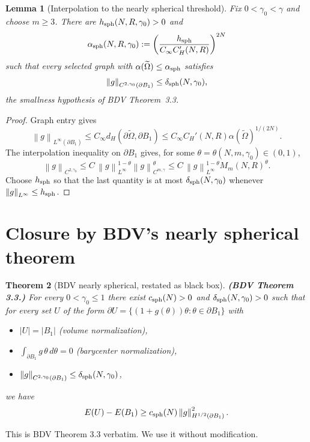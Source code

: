 \documentclass[11pt]{article}
\newtheorem{theorem}{Theorem}
\newtheorem{lemma}[theorem]{Lemma}
\theoremstyle{definition}
\newcommand{\norm}[1]{\left\|#1\right\|}
\newcommand{\abs}[1]{\left|#1\right|}
\renewcommand{\d}{\,d}
\begin{document}
\begin{lemma}[Interpolation to the nearly spherical threshold]\label{lem:interp}
Fix $0<\gamma_0<\gamma$ and choose $m\ge3$. There are
$h_{\rm sph}(N,R,\gamma_0)>0$ and
\[
\alpha_{\rm sph}(N,R,\gamma_0)
:=\left(\frac{h_{\rm sph}}{C_\infty C_H'(N,R)}\right)^{2N}
\]
such that every selected graph with
$\alpha(\widetilde\Omega)\le\alpha_{\rm sph}$ satisfies
\[
\norm{g}_{C^{2,\gamma_0}(\partial B_1)}
\le \delta_{\rm sph}(N,\gamma_0),
\]
the smallness hypothesis of BDV Theorem~3.3.
\end{lemma}

\begin{proof}
Graph entry gives
\[
\norm{g}_{L^\infty(\partial B_1)}
\le C_\infty d_H(\partial\widetilde\Omega,\partial B_1)
\le C_\infty C_H'(N,R)\alpha(\widetilde\Omega)^{1/(2N)}.
\]
The interpolation inequality on $\partial B_1$ gives, for some
$\theta=\theta(N,m,\gamma_0)\in(0,1)$,
\[
\norm{g}_{C^{2,\gamma_0}}
\le C\,\norm{g}_{L^\infty}^{1-\theta}
       \norm{g}_{C^{m,\gamma}}^\theta
\le C\,\norm{g}_{L^\infty}^{1-\theta}M_m(N,R)^\theta.
\]
Choose $h_{\rm sph}$ so that the last quantity is at most
$\delta_{\rm sph}(N,\gamma_0)$ whenever $\norm{g}_{L^\infty}\le h_{\rm sph}$.
\end{proof}

\section{Closure by BDV's nearly spherical theorem}\label{sec:closure}

\begin{theorem}[BDV nearly spherical, restated as black box]\label{thm:nearlysph}
\textbf{(BDV Theorem 3.3.)} For every $0<\gamma_0\le1$ there exist
$c_{\rm sph}(N)>0$ and $\delta_{\rm sph}(N,\gamma_0)>0$ such that for every set $U$ of the form
$\partial U=\{(1+g(\theta))\theta:\theta\in\partial B_1\}$ with
\begin{itemize}
\item $\abs U=\abs{B_1}$ (volume normalization),
\item $\int_{\partial B_1}g\,\theta\d\theta=0$ (barycenter normalization),
\item $\norm{g}_{C^{2,\gamma_0}(\partial B_1)}\le\delta_{\rm sph}(N,\gamma_0)$,
\end{itemize}
we have
\[
E(U)-E(B_1)\ge c_{\rm sph}(N)\norm{g}_{H^{1/2}(\partial B_1)}^2.
\]
\end{theorem}

This is BDV Theorem 3.3 verbatim. We use it without modification.
\end{document}
